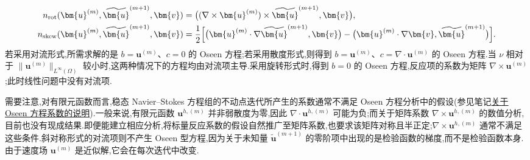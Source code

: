 \begin{note}[Picard 迭代]
\[\begin{aligned}
  n_{\mathrm{rot}}(\bm{u}^{(m)},\widetilde{\bm{u}}^{(m+1)},\bm{v})
    &=\bigl((\nabla\times\bm{u}^{(m)})
              \times\widetilde{\bm{u}}^{(m+1)},\bm{v}\bigr),\\
  n_{\mathrm{skew}}(\bm{u}^{(m)},\widetilde{\bm{u}}^{(m+1)},\bm{v})
    &=\frac12\Bigl[
       \bigl(\bm{u}^{(m)}\cdot\nabla
              \widetilde{\bm{u}}^{(m+1)},\bm{v}\bigr)
       -\bigl(\bm{u}^{(m)}\cdot\nabla\bm{v},
              \widetilde{\bm{u}}^{(m+1)}\bigr)\Bigr].
\end{aligned}
\]
若采用对流形式,所需求解的是 $b=\bm{u}^{(m)}$、$c=0$ 的 Oseen 方程;若采用散度形式,则得到 $b=\bm{u}^{(m)}$、$c=\nabla\cdot\bm{u}^{(m)}$ 的 Oseen 方程.当 $\nu$ 相对于 $\|\bm{u}^{(m)}\|_{L^\infty(\Omega)}$ 较小时,这两种情况下的方程均由对流项主导.采用旋转形式时,得到 $b=0$ 的 Oseen 方程,反应项的系数为矩阵 $\nabla\times\bm{u}^{(m)}$;此时线性问题中没有对流项.

需要注意,对有限元函数而言,稳态 Navier--Stokes 方程组的不动点迭代所产生的系数通常不满足 Oseen 方程分析中的假设(参见笔记\hyperref[note:oseen-coefficients]{关于 Oseen 方程系数的说明}).一般来说,有限元函数 $\bm{u}^{h,(m)}$ 并非弱散度为零,因此 $\nabla\cdot\bm{u}^{h,(m)}$ 可能为负;而关于矩阵系数 $\nabla\times\bm{u}^{h,(m)}$ 的数值分析,目前也没有现成结果.即便能建立相应分析,将标量反应系数的假设自然推广至矩阵系数,也要求该矩阵对称且半正定;$\nabla\times\bm{u}^{h,(m)}$ 通常不满足这些条件.斜对称形式的对流项则不产生 Oseen 型方程,因为关于未知量 $\widetilde{\bm{u}}^{(m+1)}$ 的零阶项中出现的是检验函数的梯度,而不是检验函数本身.由于速度场 $\bm{u}^{(m)}$ 是近似解,它会在每次迭代中改变.
\end{note}

